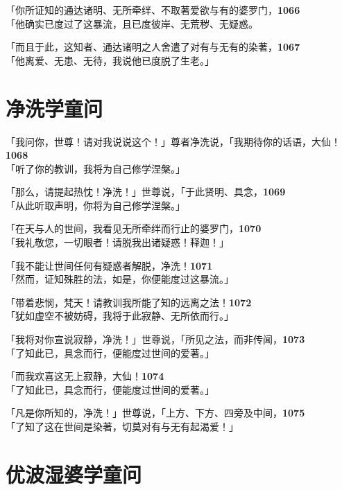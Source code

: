 「你所证知的通达诸明、无所牵绊、不取著爱欲与有的婆罗门，\hfill{\grayfootnotesize \textbf{1066}} \\
「他确实已度过了这暴流，且已度彼岸、无荒秽、无疑惑。


「而且于此，这知者、通达诸明之人舍遣了对有与无有的染著，\hfill{\grayfootnotesize \textbf{1067}} \\
「他离爱、无患、无待，我说他已度脱了生老。」


\section{净洗学童问}

「我问你，世尊！请对我说说这个！」尊者净洗说，「我期待你的话语，大仙！\hfill{\grayfootnotesize \textbf{1068}} \\
「听了你的教训，我将为自己修学涅槃。」


「那么，请提起热忱！净洗！」世尊说，「于此贤明、具念，\hfill{\grayfootnotesize \textbf{1069}} \\
「从此听取声明，你将为自己修学涅槃。」


「在天与人的世间，我看见无所牵绊而行止的婆罗门，\hfill{\grayfootnotesize \textbf{1070}} \\
「我礼敬您，一切眼者！请脱我出诸疑惑！释迦！」


「我不能让世间任何有疑惑者解脱，净洗！\hfill{\grayfootnotesize \textbf{1071}} \\
「然而，证知殊胜的法，如是，你便能度过这暴流。」


「带着悲悯，梵天！请教训我所能了知的远离之法！\hfill{\grayfootnotesize \textbf{1072}} \\
「犹如虚空不被妨碍，我将于此寂静、无所依而行。」


「我将对你宣说寂静，净洗！」世尊说，「所见之法，而非传闻，\hfill{\grayfootnotesize \textbf{1073}} \\
「了知此已，具念而行，便能度过世间的爱著。」


「而我欢喜这无上寂静，大仙！\hfill{\grayfootnotesize \textbf{1074}} \\
「了知此已，具念而行，便能度过世间的爱著。」

「凡是你所知的，净洗！」世尊说，「上方、下方、四旁及中间，\hfill{\grayfootnotesize \textbf{1075}} \\
「了知了这在世间是染著，切莫对有与无有起渴爱！」


\section{优波湿婆学童问}

